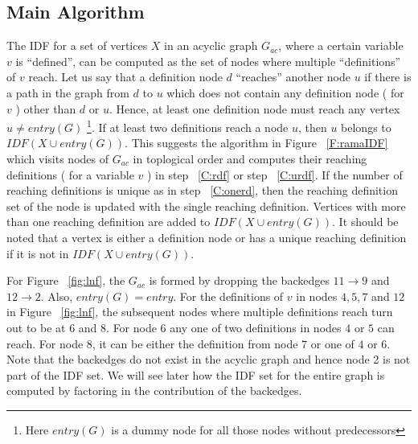     \subsection{Main Algorithm}
    The IDF for a set of vertices $X$ in an acyclic graph $G_{ac}$, where a certain
    variable $v$ is ``defined'', can be computed as the set of nodes where multiple ``definitions'' of $v$
    reach. Let us say that a definition node $d$ ``reaches'' another node $u$ if there is a path in
    the graph from $d$ to $u$ which does not contain any definition node ( for $v$ ) other than $d$ or $u$.
    Hence, at least one definition node must reach any vertex $u \neq entry(G)$ 
    \footnote{Here $entry(G)$ is a dummy node for all those nodes without predecessors}. If at least two
    definitions reach a node $u$, then $u$ belongs to $IDF(X \cup entry(G))$. 
    This suggests the algorithm in Figure ~\ref{F:ramaIDF} which visits nodes of $G_{ac}$ in
    toplogical order and computes their reaching definitions ( for a variable $v$ ) in step ~\ref{C:rdf}
    or step ~\ref{C:urdf}. If the number of reaching definitions is unique as in step ~\ref{C:onerd},
    then the reaching definition set of the node is updated with the single reaching definition.
    Vertices with more
    than one reaching definition are added to $IDF(X \cup entry(G))$. It should be noted that a 
    vertex is either a definition node or has a unique reaching definition 
    if it is not in $IDF(X \cup entry(G))$.  

    For Figure ~\ref{fig:lnf}, the $G_{ac}$ is formed by dropping
    the backedges $11 \rightarrow 9$ and $12 \rightarrow 2$. Also, $entry(G) = entry$.
    For the definitions of $v$ in nodes $4,5,7$ and $12$ in Figure ~\ref{fig:lnf}, 
    the subsequent nodes where multiple definitions reach turn out to be at $6$ and $8$. For node $6$
    any one of two definitions in nodes $4$ or $5$ can reach. For node $8$, it can be either the
    definition from node $7$ or one of $4$ or $6$.
    Note that the backedges do not exist in the acyclic
    graph and hence node 2 is not part of the IDF set. We will see later how the IDF set for the entire
    graph is computed by factoring in the contribution of the backedges. 



    
